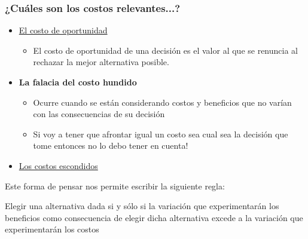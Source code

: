 \documentclass{beamer}
\begin{document}
\begin{frame}
\frametitle{¿Cuáles son los costos relevantes...? }
\begin{itemize}
    \item  \href{https://econ.video/2017/08/28/the-simpsons-opportunity-cost-of-lines/}{El costo de oportunidad}
    \begin{itemize}
        \item El costo de oportunidad de una decisión es el valor al que se renuncia al rechazar la mejor alternativa posible.
    \end{itemize}
    \vspace{2mm}
    \item \textbf{La falacia del costo hundido}  
    \begin{itemize}
        \item Ocurre cuando se están considerando costos y beneficios que no varían con las consecuencias de su decisión
        \item Si voy a tener que afrontar igual un costo sea cual sea la decisión que tome entonces no lo debo tener en cuenta!
    \end{itemize}
    \vspace{2mm}
    \item \href{https://www.goodfood.com.au/eat-out/good-food-guides/the-surprising-costs-of-running-a-restaurant-20180327-h0y23c}{Los costos escondidos} 
    \vspace{2mm}
\end{itemize}
Este forma de pensar nos permite escribir la siguiente regla:
\begin{boxA}
    Elegir una alternativa dada si y sólo si la variación que experimentarán los beneficios como consecuencia de elegir dicha alternativa excede a la variación que experimentarán los costos 
\end{boxA}

\end{frame}
\end{document}
